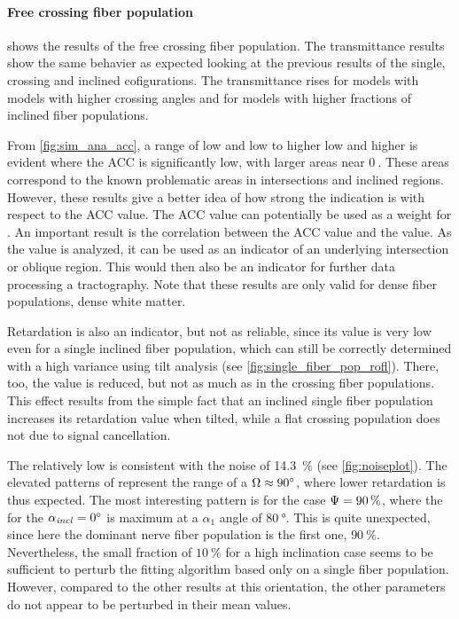 \paragraph{Free crossing fiber population}
 shows the results of the free crossing fiber population.
The transmittance results show the same behavier as expected looking at the previous results of the single, crossing and inclined cofigurations.
The transmittance rises for models with models with higher crossing angles and for models with higher fractions of inclined fiber populations.
\par
%
From \ref{fig:sim_ana_acc}, a range of low \modelPsi{} and low \modelInc{} to higher low \modelPsi{} and higher \modelInc{} is evident where the \ac{ACC} is significantly low, with larger areas near $\SI{0}{}$.
These areas correspond to the known problematic areas in intersections and inclined regions.
However, these results give a better idea of how strong the indication is with respect to the \ac{ACC} value.
The \ac{ACC} value can potentially be used as a weight for .
An important result is the correlation between the \ac{ACC} value and the \trel{} value.
As the \trel{} value is analyzed, it can be used as an indicator of an underlying intersection or oblique region.
This would then also be an indicator for further data processing \eg{} a tractography.
Note that these results are only valid for dense fiber populations, \ie{} dense white matter.
\par
%
Retardation is also an indicator, but not as reliable, since its value is very low even for a single inclined fiber population, which can still be correctly determined with a high variance using tilt analysis (see \cref{fig:single_fiber_pop_rofl}).
There, too, the \trel{} value is reduced, but not as much as in the crossing fiber populations.
This effect results from the simple fact that an inclined single fiber population increases its retardation value when tilted, while a flat crossing population does not due to signal cancellation.
\par
%
The relatively low \rvalue{} is consistent with the noise of \SI{14.3}{\percent} (see \cref{fig:noiseplot}).
The elevated patterns of \rvalue{} represent the range of a $\textnormal{$\Omega$} \approx \SI{90}{\degree}$, where lower retardation is thus expected.
The most interesting pattern is for the case $\textnormal{$\Psi$} = \SI{90}{\percent}$, where the \rvalue{} for the $\textnormal{$\alpha_{\mathit{incl}}$} = \SI{0}{\degree}$ is maximum at a $\alpha_1$  angle of $\SI{80}{\degree}$.
This is quite unexpected, since here the dominant nerve fiber population is the first one, \ie{} $\SI{90}{\percent}$.
Nevertheless, the small fraction of $\SI{10}{\percent}$ for a high inclination case seems to be sufficient to perturb the fitting algorithm based only on a single fiber population.
However, compared to the other results at this orientation, the other parameters do not appear to be perturbed in their mean values.
% 
%
%
